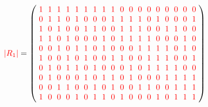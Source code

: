\documentclass{beamer}
\newcommand{\RR}[1]{\textcolor{red}{#1}}
\newcommand{\abs}[1]{|#1|}
\begin{document}
\begin{frame}

  \[
    \RR{\abs{R_1}} = 
    \left(
      \arraycolsep=3.0pt\def\arraystretch{1.0}
      \begin{array}{cccccccccccccccccc}
        \RR{1}&\RR{1}&\RR{1}&\RR{1}&\RR{1}&\RR{1}&\RR{1}&\RR{1}&\RR{1}&\RR{0}&\RR{0}&\RR{0}&\RR{0}&\RR{0}&\RR{0}&\RR{0}&\RR{0}&\RR{0}\\
        \RR{0}&\RR{1}&\RR{1}&\RR{0}&\RR{1}&\RR{0}&\RR{0}&\RR{0}&\RR{1}&\RR{1}&\RR{1}&\RR{1}&\RR{0}&\RR{1}&\RR{0}&\RR{0}&\RR{0}&\RR{1}\\
        \RR{1}&\RR{0}&\RR{1}&\RR{0}&\RR{0}&\RR{1}&\RR{1}&\RR{0}&\RR{0}&\RR{1}&\RR{1}&\RR{1}&\RR{0}&\RR{0}&\RR{1}&\RR{1}&\RR{0}&\RR{0}\\
        \RR{1}&\RR{1}&\RR{0}&\RR{1}&\RR{0}&\RR{0}&\RR{0}&\RR{1}&\RR{0}&\RR{1}&\RR{1}&\RR{1}&\RR{1}&\RR{0}&\RR{0}&\RR{0}&\RR{1}&\RR{0}\\
        \RR{0}&\RR{0}&\RR{1}&\RR{0}&\RR{1}&\RR{1}&\RR{0}&\RR{1}&\RR{0}&\RR{0}&\RR{0}&\RR{1}&\RR{1}&\RR{1}&\RR{1}&\RR{0}&\RR{1}&\RR{0}\\
        \RR{1}&\RR{0}&\RR{0}&\RR{1}&\RR{0}&\RR{1}&\RR{0}&\RR{0}&\RR{1}&\RR{1}&\RR{0}&\RR{0}&\RR{1}&\RR{1}&\RR{1}&\RR{0}&\RR{0}&\RR{1}\\
        \RR{0}&\RR{1}&\RR{0}&\RR{1}&\RR{1}&\RR{0}&\RR{1}&\RR{0}&\RR{0}&\RR{0}&\RR{1}&\RR{0}&\RR{1}&\RR{1}&\RR{1}&\RR{1}&\RR{0}&\RR{0}\\
        \RR{0}&\RR{1}&\RR{0}&\RR{0}&\RR{0}&\RR{1}&\RR{0}&\RR{1}&\RR{1}&\RR{0}&\RR{1}&\RR{0}&\RR{0}&\RR{0}&\RR{1}&\RR{1}&\RR{1}&\RR{1}\\
        \RR{0}&\RR{0}&\RR{1}&\RR{1}&\RR{0}&\RR{0}&\RR{1}&\RR{0}&\RR{1}&\RR{0}&\RR{0}&\RR{1}&\RR{1}&\RR{0}&\RR{0}&\RR{1}&\RR{1}&\RR{1}\\
        \RR{1}&\RR{0}&\RR{0}&\RR{0}&\RR{1}&\RR{0}&\RR{1}&\RR{1}&\RR{0}&\RR{1}&\RR{0}&\RR{0}&\RR{0}&\RR{1}&\RR{0}&\RR{1}&\RR{1}&\RR{1}\\
      \end{array}
    \right)
  \]
  
\end{frame}
\end{document}
